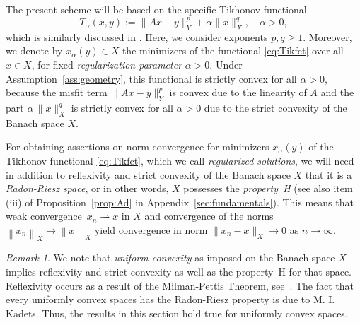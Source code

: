 \documentclass[12pt]{amsart}
\newcommand{\norm}[2]{\left\|#1\right\|_{#2}}
\theoremstyle{remark}
\newtheorem{remark}{Remark}
\begin{document}
\par

The present scheme will be based on the specific Tikhonov functional
\begin{equation} \label{eq:Tikfct}
T_\alpha(x,y):=\|Ax-y\|_Y^p+\alpha \|x\|_X^q, \quad \alpha>0,
\end{equation}
which is similarly discussed in \cite[Chapter~5]{MR2963507}. Here, we consider exponents $p,q \ge 1$.
Moreover, we denote by $x_\alpha(y) \in X$ the minimizers of the functional \eqref{eq:Tikfct} over all $x \in X$,
for fixed \emph{regularization parameter} $\alpha>0$.
Under
Assumption~\ref{ass:geometry}, this functional is strictly convex for
all $\alpha > 0$, because the misfit term $\|Ax-y\|_Y^p$ is convex due to the linearity of $A$ and the part $\alpha\,\|x\|_X^q$ is strictly convex for all $\alpha>0$ due to the strict convexity of the Banach space $X$.
\par

For obtaining assertions on norm-convergence for minimizers $x_\alpha(y)$ of the Tikhonov functional \eqref{eq:Tikfct},
which we call \emph{regularized solutions}, we will need in addition to reflexivity and strict convexity of the Banach space $X$ that it is a \emph{Radon-Riesz space}, or in other words, $X$ possesses the \emph{property~H} (see also item (iii) of Proposition~\ref{prop:Ad} in Appendix~\ref{sec:fundamentals}). This means that
weak convergence~$x_n \rightharpoonup x$ in $X$  and convergence of the norms~$\norm{x_n}{X} \to \norm{x}{X}$ yield convergence in norm $\|x_n-x\|_X \to 0$ as $n \to \infty$. 

\begin{remark}\label{rem-RR}
We note that \emph{uniform convexity} as
imposed on the Banach space $X$ implies reflexivity and strict convexity as well as the property~H for that space. Reflexivity occurs as a result of the Milman-Pettis Theorem, see~\cite[Chapt.~5.2]{YosidaFA}. The fact that every uniformly convex spaces has the Radon-Riesz property is due to M. I. Kadets. 
Thus, the results in this section hold true for uniformly convex spaces.
\end{remark}
\end{document}
